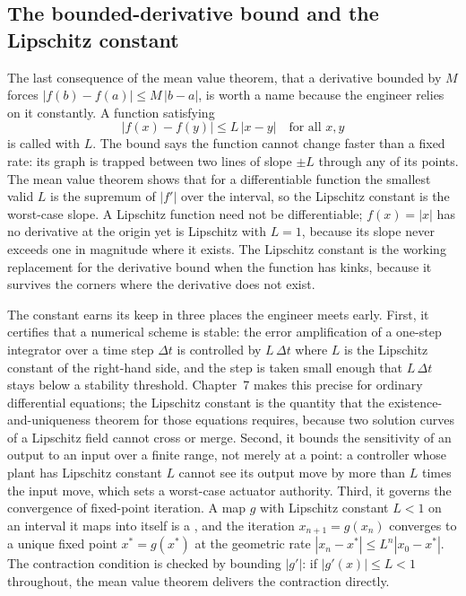 \subsection{The bounded-derivative bound and the Lipschitz constant}

The last consequence of the mean value theorem, that a derivative
bounded by $M$ forces $|f(b) - f(a)| \leq M\,|b - a|$, is worth a name
because the engineer relies on it constantly. A function satisfying
\[
|f(x) - f(y)| \leq L\,|x - y| \quad \text{for all } x, y
\]
is called  with  $L$. The bound says the function cannot change faster than a
fixed rate: its graph is trapped between two lines of slope $\pm L$
through any of its points. The mean value theorem shows that for a
differentiable function the smallest valid $L$ is the supremum of
$|f'|$ over the interval, so the Lipschitz constant is the worst-case
slope. A Lipschitz function need not be differentiable; $f(x) = |x|$ has
no derivative at the origin yet is Lipschitz with $L = 1$, because its
slope never exceeds one in magnitude where it exists. The Lipschitz
constant is the working replacement for the derivative bound when the
function has kinks, because it survives the corners where the derivative
does not exist.

The constant earns its keep in three places the engineer meets early.
First, it certifies that a numerical scheme is stable: the error
amplification of a one-step integrator over a time step $\Delta t$ is
controlled by $L\,\Delta t$ where $L$ is the Lipschitz constant of the
right-hand side, and the step is taken small enough that $L\,\Delta t$
stays below a stability threshold. Chapter~7 makes this precise for
ordinary differential equations; the Lipschitz constant is the quantity
that the existence-and-uniqueness theorem for those equations requires,
because two solution curves of a Lipschitz field cannot cross or merge.
Second, it bounds the sensitivity of an output to an input over a finite
range, not merely at a point: a controller whose plant has Lipschitz
constant $L$ cannot see its output move by more than $L$ times the input
move, which sets a worst-case actuator authority. Third, it governs the
convergence of fixed-point iteration. A map $g$ with Lipschitz constant
$L < 1$ on an interval it maps into itself is a ,
and the iteration $x_{n+1} = g(x_{n})$ converges to a unique fixed point
$x^{*} = g(x^{*})$ at the geometric rate $|x_{n} - x^{*}| \leq L^{n}
|x_{0} - x^{*}|$. The contraction condition is checked by bounding
$|g'|$: if $|g'(x)| \leq L < 1$ throughout, the mean value theorem
delivers the contraction directly.

